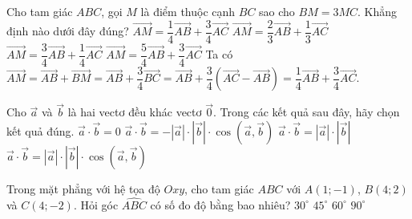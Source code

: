 \begin{ex}%
	Cho tam giác $A B C$, gọi $M$ là điểm thuộc cạnh $B C$ sao cho $B M=3 M C$. Khẳng định nào dưới đây đúng?
	\choice
	{\True $\overrightarrow{A M}=\dfrac{1}{4} \overrightarrow{A B}+\dfrac{3}{4} \overrightarrow{A C}$}
	{$\overrightarrow{A M}=\dfrac{2}{3} \overrightarrow{A B}+\dfrac{1}{3} \overrightarrow{A C}$}
	{$\overrightarrow{A M}=\dfrac{3}{4} \overrightarrow{A B}+\dfrac{1}{4} \overrightarrow{A C}$}
	{$\overrightarrow{A M}=\dfrac{5}{4} \overrightarrow{A B}+\dfrac{3}{4} \overrightarrow{A C}$}
	\loigiai
	{
		Ta có $\overrightarrow{A M}=\overrightarrow{A B}+\overrightarrow{B M}=\overrightarrow{A B}+\dfrac{3}{4} \overrightarrow{B C}=\overrightarrow{A B}+\dfrac{3}{4}(\overrightarrow{A C}-\overrightarrow{A B})=\dfrac{1}{4} \overrightarrow{A B}+\dfrac{3}{4} \overrightarrow{A C}$.
	}
\end{ex}

\begin{ex}%
	Cho $\overrightarrow{a}$ và $\overrightarrow{b}$ là hai vectơ đều khác vectơ $\overrightarrow{0}$. Trong các kết quả sau đây, hãy chọn kết quả đúng.
	\choice
	{$\overrightarrow{a} \cdot \overrightarrow{b}=0$}
	{$\overrightarrow{a} \cdot \overrightarrow{b}=-\left|\overrightarrow{a}\right|\cdot\left|\overrightarrow{b}\right|\cdot \cos\left(\overrightarrow{a}, \overrightarrow{b}\right)$}
	{$\overrightarrow{a} \cdot \overrightarrow{b}=\left|\overrightarrow{a}\right|\cdot\left|\overrightarrow{b}\right|$}
	{\True $\overrightarrow{a} \cdot \overrightarrow{b}=\left|\overrightarrow{a}\right|\cdot\left|\overrightarrow{b}\right|\cdot \cos\left(\overrightarrow{a}, \overrightarrow{b}\right)$}
\end{ex}

\begin{ex}%
	Trong mặt phẳng với hệ tọa độ $Oxy$, cho tam giác $ABC$ với $A(1;-1)$, $B(4;2)$ và $C(4;-2)$. Hỏi góc $\widehat{ABC}$ có số đo độ bằng bao nhiêu?
	\choice
	{$30^{\circ}$}
	{\True$45^{\circ}$}
	{$60^{\circ}$}
	{$90^{\circ}$}
\end{ex}

